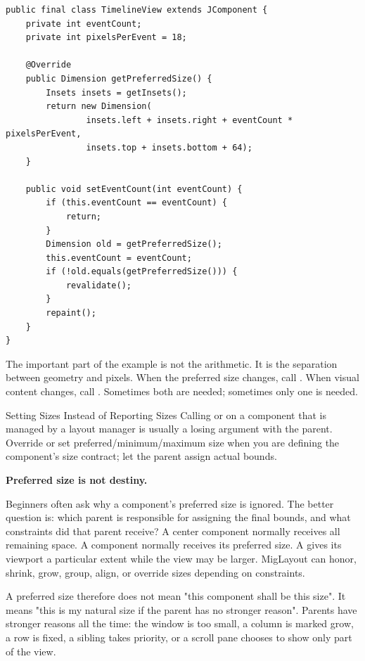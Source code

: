 \begin{lstlisting}[caption={A custom component whose preferred size expresses its data geometry.}]
public final class TimelineView extends JComponent {
    private int eventCount;
    private int pixelsPerEvent = 18;

    @Override
    public Dimension getPreferredSize() {
        Insets insets = getInsets();
        return new Dimension(
                insets.left + insets.right + eventCount * pixelsPerEvent,
                insets.top + insets.bottom + 64);
    }

    public void setEventCount(int eventCount) {
        if (this.eventCount == eventCount) {
            return;
        }
        Dimension old = getPreferredSize();
        this.eventCount = eventCount;
        if (!old.equals(getPreferredSize())) {
            revalidate();
        }
        repaint();
    }
}
\end{lstlisting}

The important part of the example is not the arithmetic. It is the separation between geometry and pixels. When the preferred size changes, call . When visual content changes, call . Sometimes both are needed; sometimes only one is needed.

\begin{pitfallbox}{Setting Sizes Instead of Reporting Sizes}
Calling  or  on a component that is managed by a layout manager is usually a losing argument with the parent. Override or set preferred/minimum/maximum size when you are defining the component's size contract; let the parent assign actual bounds.
\end{pitfallbox}

\textbf{Preferred size is not destiny.}

Beginners often ask why a component's preferred size is ignored. The better question is: which parent is responsible for assigning the final bounds, and what constraints did that parent receive? A  center component normally receives all remaining space. A  component normally receives its preferred size. A  gives its viewport a particular extent while the view may be larger. MigLayout can honor, shrink, grow, group, align, or override sizes depending on constraints.

A preferred size therefore does not mean "this component shall be this size". It means "this is my natural size if the parent has no stronger reason". Parents have stronger reasons all the time: the window is too small, a column is marked grow, a row is fixed, a sibling takes priority, or a scroll pane chooses to show only part of the view.


